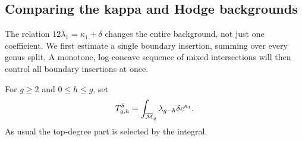\subsection{Comparing the kappa and Hodge backgrounds}
\label{subsec:s08:05}

The relation $12\lambda_1=\kappa_1+\delta$ changes the entire
background, not just one coefficient. We first estimate a single
boundary insertion, summing over every genus split. A monotone,
log-concave sequence of mixed intersections will then control all
boundary insertions at once.

For $g\geq2$ and $0\leq h\leq g$, set
\begin{equation}\label{eq:s08:node-definition}
 T_{g,h}^{\delta}
   =\int_{\overline{\mathcal{M}}_g}\lambda_{g-h}\delta e^{\kappa_1}.
\end{equation}
As usual the top-degree part is selected by the integral.

